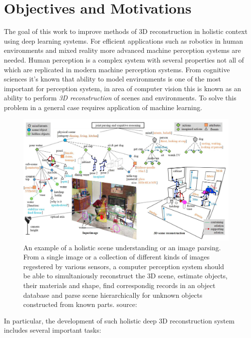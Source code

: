 \section{Objectives and Motivations}

The goal of this work to improve methods of 3D reconstruction in holistic context using deep learning systems. For efficient applications such as robotics in human environments and mixed reality more advanced machine perception systems are needed. Human perception is a complex system with several properties not all of which are replicated in modern machine perception systems. From cognitive sciences it's known that ability to model environments is one of the most important for perception system, in area of computer vision this is known as an ability to perform \textit{3D reconstruction} of scenes and environments. To solve this problem in a general case requires application of machine learning.

\begin{figure}
	\centering
    \includegraphics[width=\textwidth]{Figures/holistic_scene_reconstruction.png}
    \caption{An example of a holistic scene understanding or an image parsing. From a single image or a collection of different kinds of images regestered by various sensors, a computer perception system should be able to simultaniously reconstruct the 3D scene, estimate objects, their materials and shape, find correspondig records in an object database and parse scene hierarchically for unknown objects constructed from known parts. source: \cite{zhu2020dark}}
    \label{fig:holistic_reconstruction}
\end{figure}

In particular, the development of such holistic deep 3D reconstruction system includes several important tasks:

